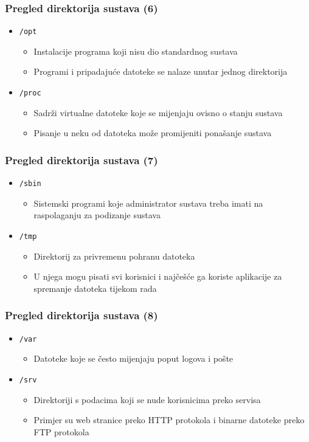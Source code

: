 \documentclass{beamer}
\begin{document}
\begin{frame}[t]
\frametitle{Pregled direktorija sustava (6)}
\begin{itemize}
  \item \texttt{/opt}
  \begin{itemize}
    \item Instalacije programa koji nisu dio standardnog sustava
    \item Programi i pripadajuće datoteke se nalaze unutar jednog
          direktorija
  \end{itemize}
  \item \texttt{/proc}
  \begin{itemize}
    \item Sadrži virtualne datoteke koje se mijenjaju ovisno o stanju
          sustava
    \item Pisanje u neku od datoteka može promijeniti ponašanje sustava
  \end{itemize}
\end{itemize}
\end{frame}


\begin{frame}[t]
\frametitle{Pregled direktorija sustava (7)}
\begin{itemize}
  \item \texttt{/sbin}
  \begin{itemize}
    \item Sistemski programi koje administrator sustava treba imati na
          raspolaganju za podizanje sustava
  \end{itemize}
  \item \texttt{/tmp}
  \begin{itemize}
    \item Direktorij za privremenu pohranu datoteka
    \item U njega mogu pisati svi korisnici i najčešće ga koriste
          aplikacije za spremanje datoteka tijekom rada
  \end{itemize}
\end{itemize}
\end{frame}

\begin{frame}[t]
\frametitle{Pregled direktorija sustava (8)}
\begin{itemize}
  \item \texttt{/var}
  \begin{itemize}
    \item Datoteke koje se često mijenjaju poput logova i pošte
  \end{itemize}
  \item \texttt{/srv}
  \begin{itemize}
    \item Direktoriji s podacima koji se nude korisnicima preko servisa
    \item Primjer su web stranice preko HTTP protokola i binarne datoteke
          preko FTP protokola
  \end{itemize}
\end{itemize}
\end{frame}
\end{document}
